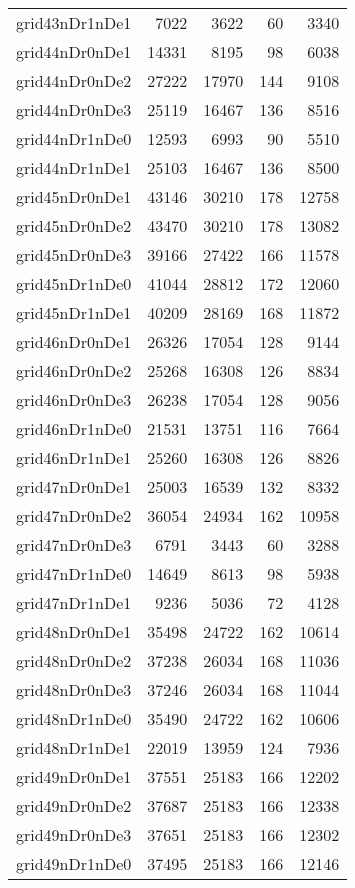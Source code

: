 \begin{longtable}{lrrrr}
grid43nDr1nDe1 & 7022 & 3622 & 60 & 3340 \\
grid44nDr0nDe1 & 14331 & 8195 & 98 & 6038 \\
grid44nDr0nDe2 & 27222 & 17970 & 144 & 9108 \\
grid44nDr0nDe3 & 25119 & 16467 & 136 & 8516 \\
grid44nDr1nDe0 & 12593 & 6993 & 90 & 5510 \\
grid44nDr1nDe1 & 25103 & 16467 & 136 & 8500 \\
grid45nDr0nDe1 & 43146 & 30210 & 178 & 12758 \\
grid45nDr0nDe2 & 43470 & 30210 & 178 & 13082 \\
grid45nDr0nDe3 & 39166 & 27422 & 166 & 11578 \\
grid45nDr1nDe0 & 41044 & 28812 & 172 & 12060 \\
grid45nDr1nDe1 & 40209 & 28169 & 168 & 11872 \\
grid46nDr0nDe1 & 26326 & 17054 & 128 & 9144 \\
grid46nDr0nDe2 & 25268 & 16308 & 126 & 8834 \\
grid46nDr0nDe3 & 26238 & 17054 & 128 & 9056 \\
grid46nDr1nDe0 & 21531 & 13751 & 116 & 7664 \\
grid46nDr1nDe1 & 25260 & 16308 & 126 & 8826 \\
grid47nDr0nDe1 & 25003 & 16539 & 132 & 8332 \\
grid47nDr0nDe2 & 36054 & 24934 & 162 & 10958 \\
grid47nDr0nDe3 & 6791 & 3443 & 60 & 3288 \\
grid47nDr1nDe0 & 14649 & 8613 & 98 & 5938 \\
grid47nDr1nDe1 & 9236 & 5036 & 72 & 4128 \\
grid48nDr0nDe1 & 35498 & 24722 & 162 & 10614 \\
grid48nDr0nDe2 & 37238 & 26034 & 168 & 11036 \\
grid48nDr0nDe3 & 37246 & 26034 & 168 & 11044 \\
grid48nDr1nDe0 & 35490 & 24722 & 162 & 10606 \\
grid48nDr1nDe1 & 22019 & 13959 & 124 & 7936 \\
grid49nDr0nDe1 & 37551 & 25183 & 166 & 12202 \\
grid49nDr0nDe2 & 37687 & 25183 & 166 & 12338 \\
grid49nDr0nDe3 & 37651 & 25183 & 166 & 12302 \\
grid49nDr1nDe0 & 37495 & 25183 & 166 & 12146 \\

\end{longtable}
